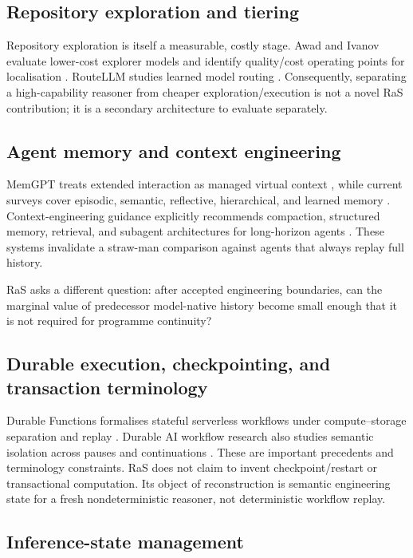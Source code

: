 \subsection{Repository exploration and tiering}

Repository exploration is itself a measurable, costly stage. Awad and Ivanov evaluate lower-cost explorer models and identify quality/cost operating points for localisation \citep{awad2026exploration}. RouteLLM studies learned model routing \citep{ong2024routellm}. Consequently, separating a high-capability reasoner from cheaper exploration/execution is not a novel RaS contribution; it is a secondary architecture to evaluate separately.

\subsection{Agent memory and context engineering}

MemGPT treats extended interaction as managed virtual context \citep{packer2023memgpt}, while current surveys cover episodic, semantic, reflective, hierarchical, and learned memory \citep{du2026memory,luo2026memory}. Context-engineering guidance explicitly recommends compaction, structured memory, retrieval, and subagent architectures for long-horizon agents \citep{anthropic2025context}. These systems invalidate a straw-man comparison against agents that always replay full history.

RaS asks a different question: after accepted engineering boundaries, can the marginal value of predecessor model-native history become small enough that it is not required for programme continuity?

\subsection{Durable execution, checkpointing, and transaction terminology}

Durable Functions formalises stateful serverless workflows under compute--storage separation and replay \citep{burckhardt2021durable}. Durable AI workflow research also studies semantic isolation across pauses and continuations \citep{mozafari2026semantic}. These are important precedents and terminology constraints. RaS does not claim to invent checkpoint/restart or transactional computation. Its object of reconstruction is semantic engineering state for a fresh nondeterministic reasoner, not deterministic workflow replay.

\subsection{Inference-state management}

